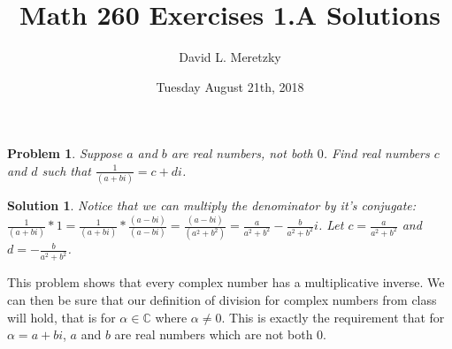 \documentclass{article}
\title{ \vspace{-10ex} %
Math 260 Exercises 1.A Solutions
}
\author{David L. Meretzky
}
\date{%
Tuesday August 21th, 2018
}
\theoremstyle{problemstyle}
\newtheorem{problem}{Problem}
\theoremstyle{problemstyle}
\newtheorem{solution}{Solution}
\begin{document}
\maketitle

\begin{problem}
Suppose $a$ and $b$ are real numbers, not both $0$. Find real numbers $c$ and $d$ such that $\frac{1}{(a+bi)} = c+di$.
\end{problem}

\begin{solution}
Notice that we can multiply the denominator by it's conjugate: $\frac{1}{(a+bi)}*1 = \frac{1}{(a+bi)}*\frac{(a-bi)}{(a-bi)} = \frac{(a-bi)}{(a^2+b^2)} = \frac{a}{a^2+b^2}-\frac{b}{a^2+b^2}i$. Let $c  = \frac{a}{a^2+b^2}$ and $d = -\frac{b}{a^2+b^2}$. 
\end{solution}

This problem shows that every complex number has a multiplicative inverse. We can then be sure that our definition of division for complex numbers from class will hold, that is for $\alpha \in \mathbb{C}$ where $\alpha \neq 0$. This is exactly the requirement that for $\alpha = a+bi$, $a$ and $b$ are real numbers which are not both $0$.
\end{document}
